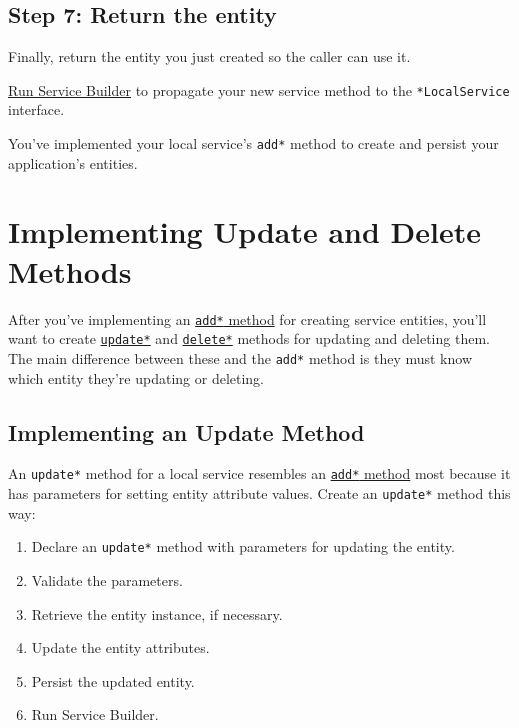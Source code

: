 \section{Step 7: Return the entity}\label{step-7-return-the-entity}

Finally, return the entity you just created so the caller can use it.

\href{/docs/7-2/appdev/-/knowledge_base/a/running-service-builder}{Run
Service Builder} to propagate your new service method to the
\texttt{*LocalService} interface.

You've implemented your local service's \texttt{add*} method to create
and persist your application's entities.

\chapter{Implementing Update and Delete
Methods}\label{implementing-update-and-delete-methods}

After you've implementing an
\href{/docs/7-2/appdev/-/knowledge_base/a/implementing-an-add-method}{\texttt{add*}
method} for creating service entities, you'll want to create
\hyperref[implementing-an-update-method]{\texttt{update*}} and
\hyperref[implementing-a-delete-method]{\texttt{delete*}} methods for
updating and deleting them. The main difference between these and the
\texttt{add*} method is they must know which entity they're updating or
deleting.

\section{Implementing an Update
Method}\label{implementing-an-update-method}

An \texttt{update*} method for a local service resembles an
\href{/docs/7-2/appdev/-/knowledge_base/a/implementing-an-add-method}{\texttt{add*}
method} most because it has parameters for setting entity attribute
values. Create an \texttt{update*} method this way:

\begin{enumerate}
\def\labelenumi{\arabic{enumi}.}
\item
  Declare an \texttt{update*} method with parameters for updating the
  entity.
\item
  Validate the parameters.
\item
  Retrieve the entity instance, if necessary.
\item
  Update the entity attributes.
\item
  Persist the updated entity.
\item
  Run Service Builder.
\end{enumerate}


